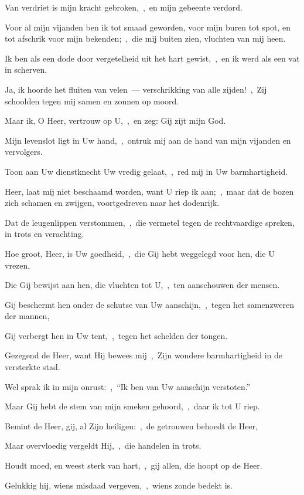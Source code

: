 \documentclass[12pt,twoside,a5paper]{article}
\begin{document}
\begin{halfparskip}
  Van verdriet is mijn kracht gebroken,~\sep\ en mijn gebeente verdord.

  Voor al mijn vijanden ben ik tot smaad geworden, voor mijn buren tot spot, en tot afschrik voor mijn bekenden;~\sep\ die mij buiten zien, vluchten van mij heen.

  Ik ben als een dode door vergetelheid uit het hart gewist,~\sep\ en ik werd als een vat in scherven.

  Ja, ik hoorde het fluiten van velen~--- verschrikking van alle zijden!~\sep\ Zij schoolden tegen mij samen en zonnen op moord.

  Maar ik, O Heer, vertrouw op U,~\sep\ en zeg: Gij zijt mijn God.

  Mijn levenslot ligt in Uw hand,~\sep\ ontruk mij aan de hand van mijn vijanden en vervolgers.

  Toon aan Uw dienstknecht Uw vredig gelaat,~\sep\ red mij in Uw barmhartigheid.

  Heer, laat mij niet beschaamd worden, want U riep ik aan;~\sep\ maar dat de bozen zich schamen en zwijgen, voortgedreven naar het dodenrijk.

  Dat de leugenlippen verstommen,~\sep\ die vermetel tegen de rechtvaardige spreken, in trots en verachting.

  Hoe groot, Heer, is Uw goedheid,~\sep\ die Gij hebt weggelegd voor hen, die U vrezen,

  Die Gij bewijst aan hen, die vluchten tot U,~\sep\ ten aanschouwen der mensen.

  Gij beschermt hen onder de schutse van Uw aanschijn,~\sep\ tegen het samenzweren der mannen,

  Gij verbergt hen in Uw tent,~\sep\ tegen het schelden der tongen.

  Gezegend de Heer, want Hij bewees mij~\sep\ Zijn wondere barmhartigheid in de versterkte stad.

  Wel sprak ik in mijn onrust:~\sep\ ``Ik ben van Uw aanschijn verstoten.''

  Maar Gij hebt de stem van mijn smeken gehoord,~\sep\ daar ik tot U riep.

  Bemint de Heer, gij, al Zijn heiligen:~\sep\ de getrouwen behoedt de Heer,

  Maar overvloedig vergeldt Hij,~\sep\ die handelen in trots.

  Houdt moed, en weest sterk van hart,~\sep\ gij allen, die hoopt op de Heer.

   Gelukkig hij, wiens misdaad vergeven,~\sep\ wiens zonde bedekt is.


\end{halfparskip}
\end{document}
